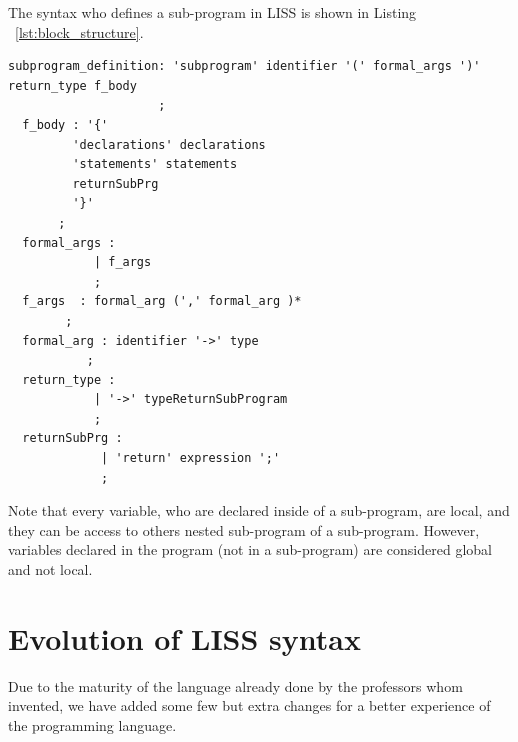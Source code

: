 \documentclass[
  oneside,
  11pt, a4paper,
  footinclude=true,
  headinclude=true,
  cleardoublepage=empty
]{scrbook}
\begin{document}
The syntax who defines a sub-program in LISS is shown in Listing ~\ref{lst:block_structure}.

\begin{lstlisting}[caption={BNF of block structure in LISS},label={lst:block_structure}]
  subprogram_definition: 'subprogram' identifier '(' formal_args ')' return_type f_body
                     ;
  f_body : '{'
         'declarations' declarations
         'statements' statements
         returnSubPrg
         '}'
       ;
  formal_args :
            | f_args
            ;
  f_args  : formal_arg (',' formal_arg )*
        ;
  formal_arg : identifier '->' type
           ;
  return_type :
            | '->' typeReturnSubProgram
            ;
  returnSubPrg :
             | 'return' expression ';'
             ;
\end{lstlisting}

Note that every variable, who are declared inside of a sub-program, are local, and they can be access to others nested sub-program of a sub-program.
However, variables declared in the program (not in a sub-program) are considered global and not local.














\newpage



\section{Evolution of LISS syntax}
Due to the maturity of the language already done by the professors whom invented, we have added some few but extra changes for a better experience of the programming language.
\end{document}
